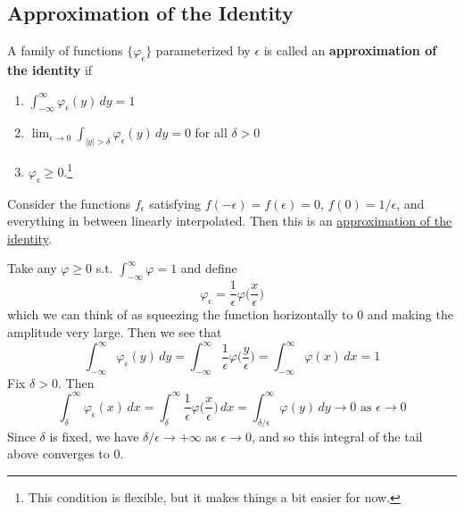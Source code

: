 \subsection{Approximation of the Identity} 

  \begin{definition}
    \label{def:approximation-of-the-identity}
    A family of functions $\{\varphi_\epsilon\}$ parameterized by $\epsilon$ is called an \textbf{approximation of the identity} if 
    \begin{enumerate}
      \item $\int_{-\infty}^{\infty} \varphi_\epsilon (y) \,dy = 1$ 
      \item $\lim_{\epsilon \to 0} \int_{|y| > \delta} \varphi_\epsilon (y) \,dy = 0$ for all $\delta > 0$ 
      \item $\varphi_\epsilon \geq 0$.\footnote{This condition is flexible, but it makes things a bit easier for now.}
    \end{enumerate}
  \end{definition}

  \begin{example}
    \label{ex:functions-satisfying-everything-between-linearly}
    Consider the functions $f_\epsilon$ satisfying $f(-\epsilon) = f(\epsilon) = 0$, $f(0) = 1/\epsilon$, and everything in between linearly interpolated. Then this is an \hyperref[def:approximation-of-the-identity]{approximation of the identity}. 
  \end{example}

  \begin{example}
    \label{ex:take-define-think-squeezing-function}
    Take any $\varphi \geq 0$ s.t. $\int_{-\infty}^\infty \varphi = 1$ and define 
    \begin{equation}
      \varphi_\epsilon = \frac{1}{\epsilon} \varphi \bigg( \frac{x}{\epsilon} \bigg)
    \end{equation}
    which we can think of as squeezing the function horizontally to $0$ and making the amplitude very large. Then we see that 
    \begin{equation}
      \int_{-\infty}^{\infty} \varphi_\epsilon (y) \,dy = \int_{-\infty}^{\infty} \frac{1}{\epsilon} \varphi \bigg(\frac{y}{\epsilon} \bigg) = \int_{-\infty}^\infty \varphi(x) \,dx = 1
    \end{equation}
    Fix $\delta > 0$. Then 
    \begin{equation}
      \int_\delta^{\infty} \varphi_\epsilon (x) \,dx = \int_\delta^\infty \frac{1}{\epsilon} \varphi \bigg( \frac{x}{\epsilon} \bigg) \,dx = \int_{\delta/\epsilon}^\infty \varphi(y) \,dy \to 0 \text{ as } \epsilon \to 0
    \end{equation}
    Since $\delta$ is fixed, we have $\delta/\epsilon \to +\infty$ as $\epsilon \to 0$, and so this integral of the tail above converges to $0$.  
  \end{example} 

